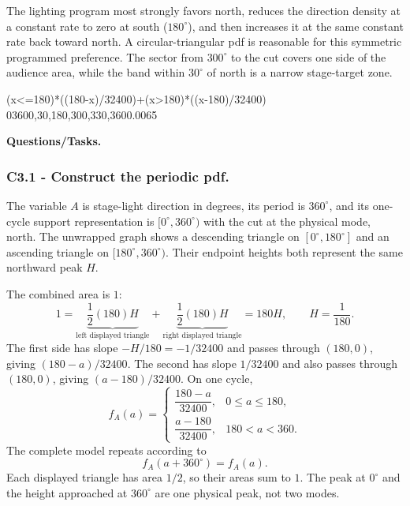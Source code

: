 	The lighting program most strongly favors north, reduces the direction density
	at a constant rate to zero at south ($180^\circ$), and then increases it at the
	same constant rate back toward north.  A circular-triangular pdf is reasonable
	for this symmetric programmed preference.  The sector from $300^\circ$ to the
	cut covers one side of the audience area, while the band within $30^\circ$ of
	north is a narrow stage-target zone.
	
	\begingroup
	{(x<=180)*((180-x)/32400)+(x>180)*((x-180)/32400)}
	{0}{360}{0,30,180,300,330,360}{0.0065}
	\endgroup
	
	\textbf{Questions/Tasks.}
	\begin{enumerate}
		\CriterionTask{subsec:c3-triangular-north-c}{3.3}{Calculate geometrically the stage light's wrapped target-band probability on $[330^\circ,360^\circ)\cup[0^\circ,30^\circ]$.}
	\end{enumerate}
	
	\subsubsection*{C3.1 - Construct the periodic pdf.}
	\label{subsec:c3-triangular-north-a}
	The variable $A$ is stage-light direction in degrees, its period is $360^\circ$,
	and its one-cycle support representation is $[0^\circ,360^\circ)$ with the cut
	at the physical mode, north.  The unwrapped graph shows a descending triangle on
	$[0^\circ,180^\circ]$ and an ascending triangle on
	$[180^\circ,360^\circ)$.  Their endpoint heights both represent the same
	northward peak $H$.
	
	The combined area is $1$:
	\[
	1=\underbrace{\frac12(180)H}_{\text{left displayed triangle}}
	+\underbrace{\frac12(180)H}_{\text{right displayed triangle}}
	=180H,
	\qquad H=\frac1{180}.
	\]
	The first side has slope $-H/180=-1/32400$ and passes through $(180,0)$,
	giving $(180-a)/32400$.  The second has slope $1/32400$ and also passes
	through $(180,0)$, giving $(a-180)/32400$.  On one cycle,
	\[
	f_A(a)=
	\begin{cases}
		\dfrac{180-a}{32400},&0\le a\le180,\\[2mm]
		\dfrac{a-180}{32400},&180<a<360.
	\end{cases}
	\]
	The complete model repeats according to
	\[
	f_A(a+360^\circ)=f_A(a).
	\]
	Each displayed triangle has area $1/2$, so their areas sum to $1$.  The peak
	at $0^\circ$ and the height approached at $360^\circ$ are one physical peak,
	not two modes.
	

